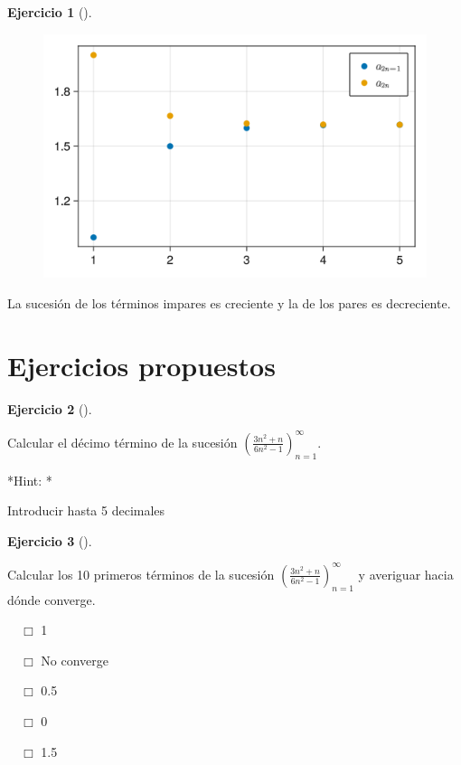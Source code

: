 \documentclass[
  a4paper,
]{scrreport}
\theoremstyle{definition}
\newtheorem{exercise}{Ejercicio}[chapter]
\theoremstyle{remark}
\begin{document}
\begin{exercise}[]
\begin{tcolorbox}
\begin{figure}[H]

{\centering \includegraphics{02-sucesiones_files/figure-pdf/cell-33-output-1.png}

}

\end{figure}

La sucesión de los términos impares es creciente y la de los pares es
decreciente.

\end{tcolorbox}

\end{exercise}

\hypertarget{ejercicios-propuestos}{%
\section{Ejercicios propuestos}\label{ejercicios-propuestos}}

\begin{exercise}[]\protect\hypertarget{exr-sucesiones-propuesto-1}{}\label{exr-sucesiones-propuesto-1}

Calcular el décimo término de la sucesión
\(\left(\frac{3n^2+n}{6n^2-1}\right)_{n=1}^\infty\).

\vspace{18pt}*Hint: *

Introducir hasta 5 decimales

\end{exercise}

\begin{exercise}[]\protect\hypertarget{exr-sucesiones-propuesto-2}{}\label{exr-sucesiones-propuesto-2}

Calcular los 10 primeros términos de la sucesión
\(\left(\frac{3n^2+n}{6n^2-1}\right)_{n=1}^\infty\) y averiguar hacia
dónde converge.

${\quad\Box}$ 1

${\quad\Box}$ No converge

${\quad\Box}$ 0.5

${\quad\Box}$ 0

${\quad\Box}$ 1.5

\end{exercise}
\end{document}
